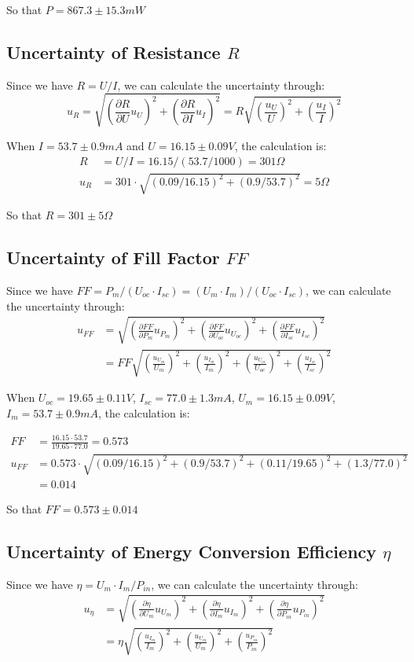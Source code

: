 \documentclass[12pt, a4paper]{article}
\begin{document}
So that $P = 867.3 \pm 15.3 mW$

\subsection{Uncertainty of Resistance $R$}
Since we have $R = U/I$, we can calculate the uncertainty through:
$$
u_R = \sqrt{(\frac{\partial R}{\partial U} u_U)^2 + (\frac{\partial R}{\partial I} u_I)^2} = R \sqrt{(\frac{u_U}{U})^2 + (\frac{u_I}{I})^2}
$$

When $I = 53.7 \pm 0.9 mA$ and $U = 16.15 \pm 0.09 V$, the calculation is:
\begin{align*}
	R &= U/I = 16.15/(53.7/1000) = 301 \Omega \\
	u_R &= 301 \cdot \sqrt{(0.09/16.15)^2 + (0.9/53.7)^2} = 5 \Omega
\end{align*}

So that $R = 301 \pm 5 \Omega$

\subsection{Uncertainty of Fill Factor $FF$}
Since we have $FF = P_m/(U_{oc}\cdot I_{sc}) = (U_m \cdot I_m)/(U_{oc} \cdot I_{sc})$, we can calculate the uncertainty through:
\begin{align*}
u_{FF} &= \sqrt{(\frac{\partial FF}{\partial P_m} u_{P_m})^2 + (\frac{\partial FF}{\partial U_{oc}}u_{U_{oc}})^2 + (\frac{\partial FF}{\partial I_{sc}}u_{I_{sc}})^2}
	\\ &= FF \sqrt{(\frac{u_{U_m}}{U_m})^2 + (\frac{u_{I_m}}{I_m})^2 + (\frac{u_{U_{oc}}}{U_{oc}})^2 + (\frac{u_{I_{sc}}}{I_{sc}})^2}
\end{align*}

When $U_{oc} = 19.65\pm 0.11 V$, $I_{sc} = 77.0\pm 1.3 mA$, $U_m = 16.15\pm 0.09 V$, $I_m = 53.7\pm 0.9 mA$, the calculation is:

\begin{align*}
	FF &= \frac{16.15 \cdot 53.7}{19.65 \cdot 77.0} = 0.573 \\
	u_{FF} &= 0.573 \cdot \sqrt{(0.09/16.15)^2 + (0.9/53.7)^2 + (0.11/19.65)^2 + (1.3/77.0)^2} \\
	       &= 0.014
\end{align*}

So that $FF = 0.573 \pm 0.014$

\subsection{Uncertainty of Energy Conversion Efficiency $\eta$}
Since we have $\eta = U_m \cdot I_m /P_{in}$, we can calculate the uncertainty through:
\begin{align*}
	u_{\eta} &= \sqrt{(\frac{\partial \eta}{\partial U_m} u_{U_m})^2 + (\frac{\partial \eta}{\partial I_m}u_{I_m})^2 + (\frac{\partial \eta}{\partial P_{in}} u_{P_{in}})^2} \\
			 &= \eta \sqrt{(\frac{u_{I_m}}{I_m})^2 + (\frac{u_{U_m}}{U_m})^2 + (\frac{u_{P_{in}}}{P_{in}})^2}
\end{align*}
\end{document}
